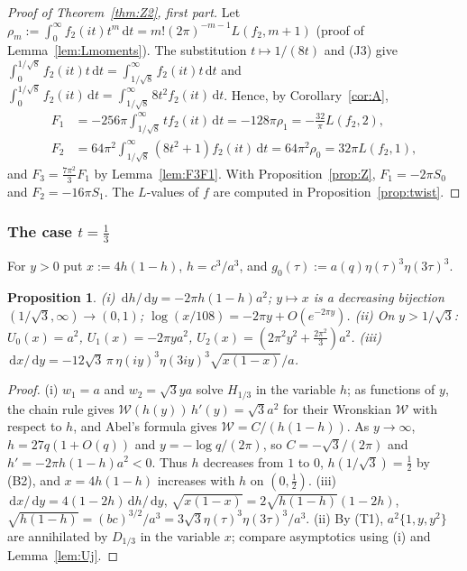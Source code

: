 \documentclass[11pt]{amsart}
\newtheorem{proposition}[theorem]{Proposition}
\theoremstyle{definition}
\theoremstyle{remark}
\numberwithin{equation}{section}
\newcommand{\dd}{\,\mathrm{d}}
\begin{document}
\begin{proof}[Proof of Theorem~\ref{thm:Z2}, first part]
Let $\rho_m:=\int_0^\infty f_2(it)t^m\dd t=m!(2\pi)^{-m-1}L(f_2,m+1)$ (proof of Lemma~\ref{lem:Lmoments}). The substitution $t\mapsto1/(8t)$ and (J3) give $\int_0^{1/\sqrt8}f_2(it)t\dd t=\int_{1/\sqrt8}^\infty f_2(it)t\dd t$ and $\int_0^{1/\sqrt8}f_2(it)\dd t=\int_{1/\sqrt8}^\infty8t^2f_2(it)\dd t$. Hence, by Corollary~\ref{cor:A},
\begin{align*}
F_1&=-256\pi\int_{1/\sqrt8}^\infty tf_2(it)\dd t=-128\pi\rho_1=-\frac{32}\pi L(f_2,2),\\ F_2&=64\pi^2\int_{1/\sqrt8}^\infty(8t^2+1)f_2(it)\dd t=64\pi^2\rho_0=32\pi L(f_2,1),
\end{align*}
and $F_3=\frac{7\pi^2}3F_1$ by Lemma~\ref{lem:F3F1}. With Proposition~\ref{prop:Z}, $F_1=-2\pi S_0$ and $F_2=-16\pi S_1$. The $L$-values of $f$ are computed in Proposition~\ref{prop:twist}.
\end{proof}

\subsubsection{\texorpdfstring{The case $t=\frac13$}{The case t=1/3}}
For $y>0$ put $x:=4h(1-h)$, $h=c^3/a^3$, and $g_0(\tau):=a(q)\eta(\tau)^3\eta(3\tau)^3$.

\begin{proposition}\label{prop:paramB}
\textup{(i)} $\dd h/\dd y=-2\pi h(1-h)a^2$; $y\mapsto x$ is a decreasing bijection $(1/\sqrt3,\infty)\to(0,1)$; $\log(x/108)=-2\pi y+O(e^{-2\pi y})$.
\textup{(ii)} On $y>1/\sqrt3$: $U_0(x)=a^2$, $U_1(x)=-2\pi ya^2$, $U_2(x)=(2\pi^2y^2+\frac{2\pi^2}3)a^2$.
\textup{(iii)} $\dd x/\dd y=-12\sqrt3\,\pi\,\eta(iy)^3\eta(3iy)^3\sqrt{x(1-x)}/a$.
\end{proposition}
\begin{proof}
(i) $w_1=a$ and $w_2=\sqrt3ya$ solve $H_{1/3}$ in the variable $h$; as functions of $y$, the chain rule gives $\mathcal W(h(y))\,h'(y)=\sqrt3a^2$ for their Wronskian $\mathcal W$ with respect to $h$, and Abel's formula gives $\mathcal W=C/(h(1-h))$. As $y\to\infty$, $h=27q(1+O(q))$ and $y=-\log q/(2\pi)$, so $C=-\sqrt3/(2\pi)$ and $h'=-2\pi h(1-h)a^2<0$. Thus $h$ decreases from $1$ to $0$, $h(1/\sqrt3)=\frac12$ by (B2), and $x=4h(1-h)$ increases with $h$ on $(0,\frac12)$.
(iii) $\dd x/\dd y=4(1-2h)\dd h/\dd y$, $\sqrt{x(1-x)}=2\sqrt{h(1-h)}(1-2h)$, $\sqrt{h(1-h)}=(bc)^{3/2}/a^3=3\sqrt3\eta(\tau)^3\eta(3\tau)^3/a^3$.
(ii) By (T1), $a^2\{1,y,y^2\}$ are annihilated by $D_{1/3}$ in the variable $x$; compare asymptotics using (i) and Lemma~\ref{lem:Uj}.
\end{proof}
\end{document}
